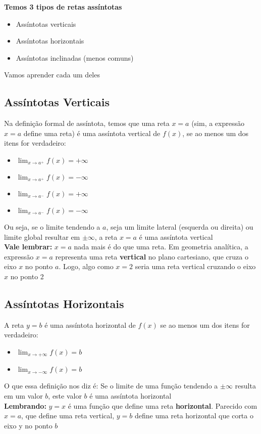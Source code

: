 \documentclass{article}
\begin{document}
\noindent \textbf{Temos 3 tipos de retas assíntotas}
\begin{itemize}
    \item Assíntotas verticais
    \item Assíntotas horizontais
    \item Assíntotas inclinadas (menos comuns)
\end{itemize}
Vamos aprender cada um deles

\subsection{Assíntotas Verticais}
Na definição formal de assíntota, temos que uma reta \( x = a \) (sim, a expressão $x = a$ define uma reta) é uma assíntota vertical de \( f(x) \), se ao menos um dos itens for verdadeiro:
\begin{itemize}
\item $\displaystyle \lim_{x \to a^+} f(x) = +\infty$

\item $\displaystyle \lim_{x \to a^+} f(x) = -\infty$

\item $\displaystyle \lim_{x \to a^-} f(x) = +\infty$

\item $\displaystyle \lim_{x \to a^-} f(x) = -\infty$
\end{itemize}
Ou seja, se o limite tendendo a $a$, seja um limite lateral (esquerda ou direita) ou limite global resultar em $\pm\infty$, a reta $x = a$ é uma assíntota vertical\\[10pt]
\textbf{Vale lembrar:} $x = a$ nada mais é do que uma reta. Em geometria analítica, a expressão $x = a$ representa uma reta \textbf{vertical} no plano cartesiano, que cruza o eixo $x$ no ponto $a$. Logo, algo como $x = 2$ seria uma reta vertical cruzando o eixo $x$ no ponto 2

\subsection{Assíntotas Horizontais}
A reta $y = b$ é uma assíntota horizontal de $f(x)$ se ao menos um dos itens for verdadeiro:
\begin{itemize}
\item $\displaystyle \lim_{x \to +\infty} f(x) = b$

\item $\displaystyle \lim_{x \to -\infty} f(x) = b$
\end{itemize}
O que essa definição nos diz é: Se o limite de uma função tendendo a $\pm\infty$ resulta em um valor $b$, este valor $b$ é uma assíntota horizontal\\[10pt]
\textbf{Lembrando:} $y = x$ é uma função que define uma reta \textbf{horizontal}. Parecido com $x = a$, que define uma reta vertical, $y = b$ define uma reta horizontal que corta o eixo y no ponto $b$
\end{document}
